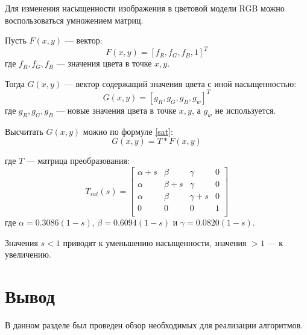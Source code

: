 Для изменения насыщенности изображения в цветовой модели RGB можно воспользоваться умножением матриц.

Пусть $F(x,y)$ --- вектор:
\begin{equation}
	\label{F}
	F(x,y) = [f_R, f_G, f_B, 1]^T
\end{equation}
где $f_R, f_G, f_B$ --- значения цвета в точке $x,y$.

Тогда $G(x,y)$ --- вектор содержащий значения цвета с иной насыщенностью:
\begin{equation}
	\label{G}
	G(x,y) = [g_R, g_G, g_B, g_w]^T
\end{equation}
где $g_R, g_G, g_B$ --- новые значения цвета в точке $x,y$, а $g_w$ не используется.

Высчитать $G(x,y)$ можно по формуле \ref{sat}:
\begin{equation}
	\label{sat}
	G(x,y) = T * F(x,y)
\end{equation}

где $T$ --- матрица преобразования:
\begin{equation}
	\label{tsat}
	T_{sat}(s) = \begin{bmatrix}
					\alpha + s & \beta & \gamma & 0\\
				    \alpha & \beta + s & \gamma & 0 \\ 
					\alpha & \beta & \gamma + s & 0 \\ 
					0 & 0 & 0 & 1 \\ 
				\end{bmatrix}
\end{equation}
где $\alpha = 0.3086(1 - s)$, $\beta = 0.6094(1 - s)$ и $\gamma = 0.0820(1 - s)$.

Значения $s < 1$ приводят к уменьшению насыщенности, значения $> 1$ --- к увеличению. \cite{sat}

\section*{Вывод}
В данном разделе был проведен обзор необходимых для реализации алгоритмов.